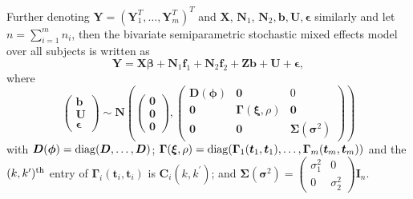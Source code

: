 \documentclass[12pt, notitlepage]{article}
\begin{document}
Further denoting $\boldsymbol  Y = (\boldsymbol Y_1^T, \dots, \boldsymbol Y_m^T)^T$ and $\boldsymbol  X$, $\boldsymbol  N_1$, $\boldsymbol  N_2, \boldsymbol b, \boldsymbol U, \boldsymbol \epsilon$ similarly and let $n = \sum_{i = 1}^m n_i$, then  the bivariate semiparametric stochastic mixed effects model over all subjects is written as
\begin{equation} \label{propM}
\boldsymbol Y 
=
\boldsymbol{X}\boldsymbol{\beta} 
+ \boldsymbol N_1 \boldsymbol f_1 
+ \boldsymbol N_2 \boldsymbol f_2 
+ \boldsymbol{Z}\boldsymbol{b}
+ \boldsymbol U 
+ \boldsymbol \epsilon,
\end{equation}
where 
\[
 \begin{pmatrix}
  \boldsymbol b \\
  \boldsymbol U  \\
 \boldsymbol \epsilon
 \end{pmatrix}
 \sim 
 \boldsymbol N \left(
 \begin{pmatrix}
\boldsymbol 0 \\
\boldsymbol 0 \\
 \boldsymbol 0 
 \end{pmatrix},
  \begin{pmatrix}
  \boldsymbol D(\boldsymbol \phi) &  \boldsymbol 0 & 0 \\
  \boldsymbol 0 & \boldsymbol \Gamma (\boldsymbol \xi, \rho) & \boldsymbol 0 \\
 \boldsymbol 0 & \boldsymbol 0 &  \boldsymbol \Sigma (\boldsymbol \sigma^2) 
 \end{pmatrix}
 \right) 
\]
with 
$\boldsymbol D (\boldsymbol \phi) = {\rm diag} (\boldsymbol D, \dots, \boldsymbol D)$; 
$\boldsymbol \Gamma (\boldsymbol \xi, \rho) = {\rm diag} (  \boldsymbol \Gamma_1 (\boldsymbol t_1, \boldsymbol t_1), \dots,   \boldsymbol \Gamma_m(\boldsymbol t_m, \boldsymbol t_m))$
and the $(k, k^\prime)^{\rm th}$ entry of $ \boldsymbol \Gamma_i(\boldsymbol t_i, \boldsymbol t_i)$ is $\boldsymbol C_i(k, k^\prime)$;
and
$
\boldsymbol \Sigma(\boldsymbol \sigma^2) =
   \begin{pmatrix}
  \sigma^2_{1} &   0  \\
0 &   \sigma^2_{2} 
 \end{pmatrix} \boldsymbol I_{n}.
$
\end{document}
